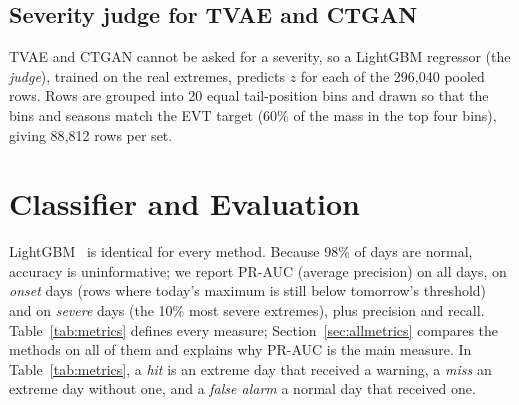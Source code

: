 \documentclass[12pt,a4paper]{report}
\begin{document}
\subsection{Severity judge for TVAE and CTGAN}
TVAE and CTGAN cannot be asked for a severity, so a LightGBM regressor (the \emph{judge}), trained on the real extremes,
predicts $z$ for each of the 296{,}040 pooled rows. Rows are grouped into 20 equal tail-position bins and drawn so that
the bins and seasons match the EVT target (60\% of the mass in the top four bins), giving 88{,}812 rows per set.

\section{Classifier and Evaluation}
\label{sec:metricsdef}
LightGBM~\cite{ke2017lightgbm} is identical for every method. Because 98\% of days are normal, accuracy is
uninformative; we report PR-AUC (average precision) on all days, on \emph{onset} days (rows where today's maximum is still below tomorrow's threshold) and on
\emph{severe} days (the 10\% most severe extremes), plus precision and recall. Table~\ref{tab:metrics} defines every
measure; Section~\ref{sec:allmetrics} compares the methods on all of them and explains why PR-AUC is the main
measure. In Table~\ref{tab:metrics}, a \emph{hit} is an extreme day that received a warning, a \emph{miss} an extreme day without one, and a
\emph{false alarm} a normal day that received one.
\end{document}
